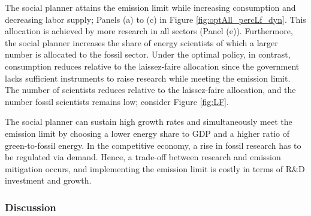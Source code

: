 \begin{figure}[h!!!]
\begin{subfigure}[]{0.4\textwidth}
\end{subfigure}

\end{figure} 
%
The social planner attains the emission limit while increasing consumption and decreasing labor supply; Panels (a) to (c) in Figure \ref{fig:optAll_percLf_dyn}. This allocation is achieved by more research in all sectors (Panel (e)). Furthermore, the social planner increases the share of energy scientists of which a larger number is allocated to the fossil sector. 
Under the optimal policy, in contrast, consumption reduces relative to the laissez-faire allocation since the government lacks sufficient instruments to raise research while meeting the emission limit. The number of scientists reduces relative to the laissez-faire allocation, and the number fossil scientists remains low; consider Figure \ref{fig:LF}.

The social planner can sustain  high growth rates and simultaneously meet the emission limit by choosing a lower energy share to GDP and a higher ratio of green-to-fossil energy. 
In the competitive economy, a rise in fossil research has to be regulated via demand. Hence, a trade-off between research and emission mitigation occurs, and implementing the emission limit is costly in terms of R\&D investment and growth. 


\subsubsection{Discussion}\label{subsec:dis}


